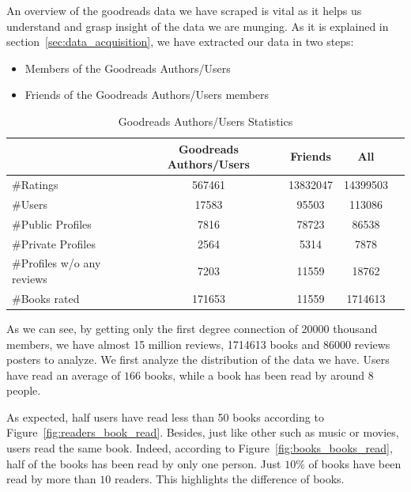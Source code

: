 \documentclass[11pt]{article}
\begin{document}
An overview of the goodreads data we have scraped is vital as it helps us understand and grasp insight of the data we are munging.
As it is explained in section~\ref{sec:data_acquisition}, we have extracted our data in two steps:
\begin{itemize}
\item Members of the Goodreads Authors/Users
\item Friends of the Goodreads Authors/Users members
\end{itemize}

\begin{table}[h]
\begin{center}
\begin{tabular}{lcccc}
\hline
                           &  Goodreads Authors/Users    &   Friends                &   All        \\ \hline
\#Ratings                  &  567461                     &   13832047               &   14399503  \\ \hline
\#Users                    &  17583                      &   95503                  &   113086     \\ \hline
\#Public Profiles          &  7816                       &   78723                  &   86538     \\ \hline
\#Private Profiles         &  2564                       &   5314                   &   7878      \\ \hline
\#Profiles w/o any reviews &  7203                       &   11559                  &   18762      \\ \hline
\#Books rated              &  171653                     &   11559                  &   1714613      \\ \hline
\end{tabular}
\end{center}
\caption{Goodreads Authors/Users Statistics} \label{table:crawl_stat}
\end{table}


As we can see, by getting only the first degree connection of 20000 thousand members, we have almost 15 million reviews, 1714613 books and 86000 reviews posters to analyze.
We first analyze the distribution of the data we have.
Users have read an average of $166$ books, while a book has been read by around $8$ people. 

As expected, half users have read less than 50 books according to Figure~\ref{fig:readers_book_read}. Besides, just like other such as music or movies, users read the same book. Indeed, according to Figure~\ref{fig:books_books_read}, half of the books has been read by only one person. Just $10$\% of books have been read by more than $10$ readers. This highlights the difference of books.
\end{document}
